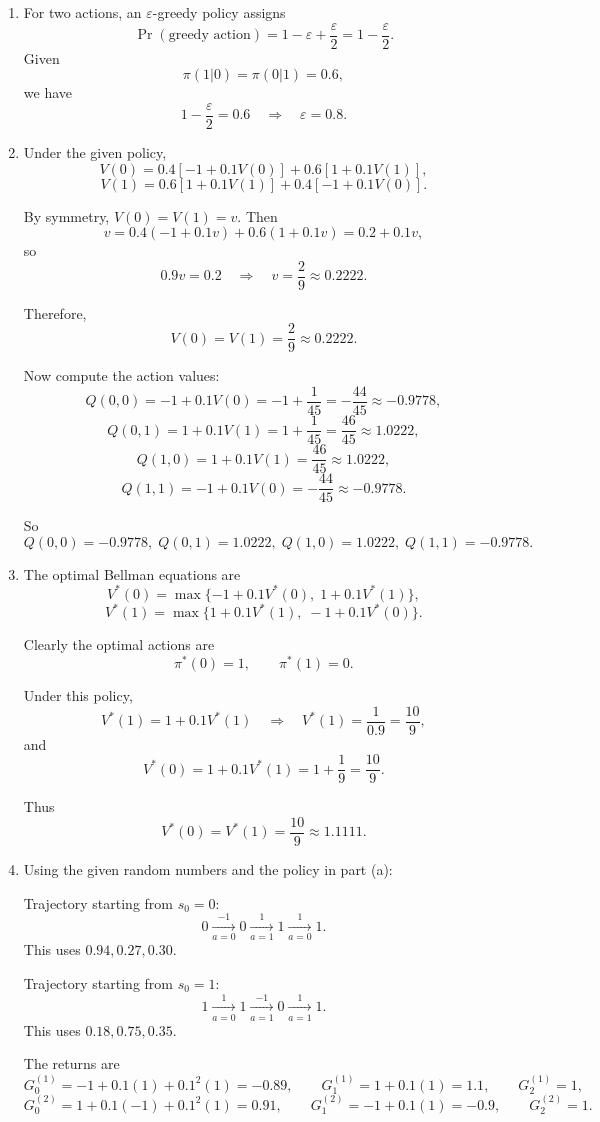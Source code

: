 \documentclass[11pt]{article}
\begin{document}
\begin{enumerate}[label=\alph*)]
\item For two actions, an \(\varepsilon\)-greedy policy assigns
\[
\Pr(\text{greedy action})=1-\varepsilon+\frac{\varepsilon}{2}=1-\frac{\varepsilon}{2}.
\]
Given
\[
\pi(1|0)=\pi(0|1)=0.6,
\]
we have
\[
1-\frac{\varepsilon}{2}=0.6
\quad\Rightarrow\quad
\varepsilon=0.8.
\]

\item Under the given policy,
\[
V(0)=0.4[-1+0.1V(0)] + 0.6[1+0.1V(1)],
\]
\[
V(1)=0.6[1+0.1V(1)] + 0.4[-1+0.1V(0)].
\]

By symmetry, \(V(0)=V(1)=v\). Then
\[
v=0.4(-1+0.1v)+0.6(1+0.1v)=0.2+0.1v,
\]
so
\[
0.9v=0.2
\quad\Rightarrow\quad
v=\frac{2}{9}\approx 0.2222.
\]

Therefore,
\[
\boxed{V(0)=V(1)=\frac{2}{9}\approx 0.2222.}
\]

Now compute the action values:
\[
Q(0,0)=-1+0.1V(0)=-1+\frac{1}{45}=-\frac{44}{45}\approx -0.9778,
\]
\[
Q(0,1)=1+0.1V(1)=1+\frac{1}{45}=\frac{46}{45}\approx 1.0222,
\]
\[
Q(1,0)=1+0.1V(1)=\frac{46}{45}\approx 1.0222,
\]
\[
Q(1,1)=-1+0.1V(0)=-\frac{44}{45}\approx -0.9778.
\]

So
\[
\boxed{
Q(0,0)=-0.9778,\;
Q(0,1)=1.0222,\;
Q(1,0)=1.0222,\;
Q(1,1)=-0.9778.}
\]

\item The optimal Bellman equations are
\[
V^*(0)=\max\{-1+0.1V^*(0),\; 1+0.1V^*(1)\},
\]
\[
V^*(1)=\max\{1+0.1V^*(1),\; -1+0.1V^*(0)\}.
\]

Clearly the optimal actions are
\[
\boxed{\pi^*(0)=1,\qquad \pi^*(1)=0.}
\]

Under this policy,
\[
V^*(1)=1+0.1V^*(1)
\quad\Rightarrow\quad
V^*(1)=\frac{1}{0.9}=\frac{10}{9},
\]
and
\[
V^*(0)=1+0.1V^*(1)=1+\frac{1}{9}=\frac{10}{9}.
\]

Thus
\[
\boxed{V^*(0)=V^*(1)=\frac{10}{9}\approx 1.1111.}
\]

\item Using the given random numbers and the policy in part (a):

Trajectory starting from \(s_0=0\):
\[
0 \xrightarrow[a=0]{-1} 0 \xrightarrow[a=1]{1} 1 \xrightarrow[a=0]{1} 1.
\]
This uses \(0.94, 0.27, 0.30\).

Trajectory starting from \(s_0=1\):
\[
1 \xrightarrow[a=0]{1} 1 \xrightarrow[a=1]{-1} 0 \xrightarrow[a=1]{1} 1.
\]
This uses \(0.18, 0.75, 0.35\).

The returns are
\[
G_0^{(1)}=-1+0.1(1)+0.1^2(1)=-0.89,\qquad
G_1^{(1)}=1+0.1(1)=1.1,\qquad
G_2^{(1)}=1,
\]
\[
G_0^{(2)}=1+0.1(-1)+0.1^2(1)=0.91,\qquad
G_1^{(2)}=-1+0.1(1)=-0.9,\qquad
G_2^{(2)}=1.
\]


\end{enumerate}
\end{document}
